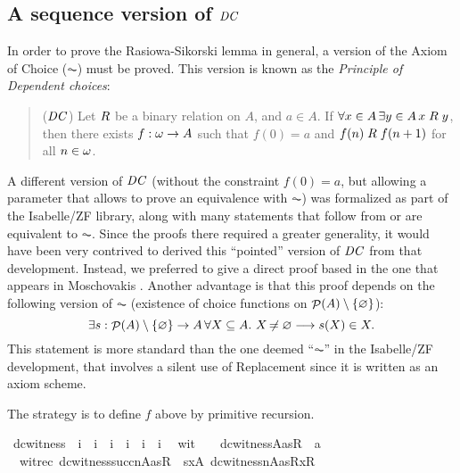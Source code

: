 \subsection{A sequence version of $\mathit{DC}$}\label{sec:sequence-version-dc}
In order to prove the Rasiowa-Sikorski lemma in
general, a version of the Axiom of Choice ($\AC$) must be proved. This
version is known as the \emph{Principle of Dependent choices}:
\begin{quote}
  ($\mathit{DC}$) Let $\mathrel{R}$ be a binary relation on $A$, and $a\in A$. If
  $\forall x\in A\,  \exists y\in A\, x\mathrel{R} y$, then there exists
  $f:\omega\to A$ such that $f(0)=a$ and $f(n)\mathrel{R} f(n+1)$ for all
  $n\in\omega$.
\end{quote}

A different version of $\mathit{DC}$ (without the constraint $f(0)=a$, but
allowing a parameter that allows to prove an equivalence with $\AC$) was
formalized as part of the Isabelle/ZF library, along with many
statements that follow from or are equivalent to $\AC$. Since the
proofs there required a greater generality, it would have been very
contrived to derived this ``pointed'' version of $\mathit{DC}$ from that
development. Instead, we preferred to give a direct proof based in the
one that appears in Moschovakis \cite{moschovakis1994notes}. Another
advantage is that this proof depends on the following version of $\AC$
(existence of choice functions on $\mathop{\mathcal{P}}(A)\setminus \{\varnothing\}$):
\[
\exists s: \mathop{\mathcal{P}}(A)\setminus \{\varnothing\}\to A \, \forall X\subseteq A.\ X\not\nobreak\mkern -2mu = \varnothing \longrightarrow
s(X) \in X.
\]
This statement is more standard than the one deemed ``$\AC$'' in the
Isabelle/ZF development, that involves a silent use of Replacement
since it is written as an axiom scheme. 

The strategy is to define $f$ above by primitive recursion. 

\begin{isabelle}\isamarkuptrue%
\isamarkupfalse%
\ dc{\isacharunderscore}witness\ {\isacharcolon}{\isacharcolon}\ {\isachardoublequoteopen}i\ {\isasymRightarrow}\ i\ {\isasymRightarrow}\ i\ {\isasymRightarrow}\ i\ {\isasymRightarrow}\ i\ {\isasymRightarrow}\ i{\isachardoublequoteclose}\isanewline
{}\isamarkupfalse%
\isanewline
\ \ wit{}\ \ \ {\isacharcolon}\ {\isachardoublequoteopen}dc{\isacharunderscore}witness{\isacharparenleft}{}{\isacharcomma}A{\isacharcomma}a{\isacharcomma}s{\isacharcomma}R{\isacharparenright}\ {\isacharequal}\ a{\isachardoublequoteclose}\isanewline
\ \ witrec\ {\isacharcolon}{\isachardoublequoteopen}dc{\isacharunderscore}witness{\isacharparenleft}succ{\isacharparenleft}n{\isacharparenright}{\isacharcomma}A{\isacharcomma}a{\isacharcomma}s{\isacharcomma}R{\isacharparenright}\ {\isacharequal}\ s{\isacharbackquote}{\isacharbraceleft}x{\isasymin}A{\isachardot}\ {\isasymlangle}dc{\isacharunderscore}witness{\isacharparenleft}n{\isacharcomma}A{\isacharcomma}a{\isacharcomma}s{\isacharcomma}R{\isacharparenright}{\isacharcomma}x{\isasymrangle}{\isasymin}R\ {\isacharbraceright}{\isachardoublequoteclose}
\end{isabelle}

